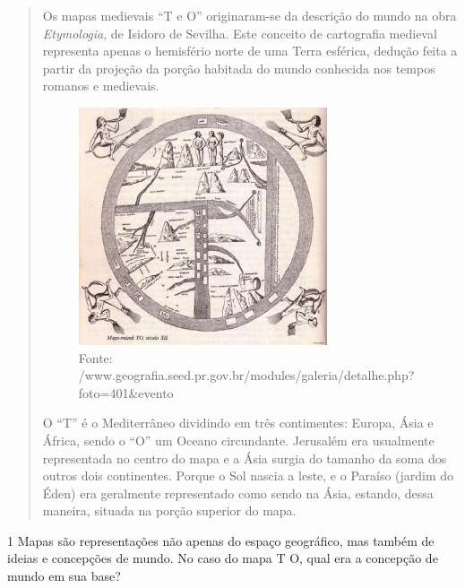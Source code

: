 \begin{quote}
Os mapas medievais ``T e O'' originaram-se da descrição do mundo na
obra \emph{Etymologia}, de Isidoro de Sevilha. Este conceito de
cartografia medieval representa apenas o hemisfério norte de uma Terra
esférica, dedução feita a partir da projeção da porção habitada do mundo
conhecida nos tempos romanos e medievais.

\begin{figure}[htpb!]
\includegraphics[width=2.88577in,height=2.76032in]{./imgs/img1.jpg}
\caption{Fonte: /www.geografia.seed.pr.gov.br/modules/galeria/detalhe.php?foto=401\&evento}
\end{figure}

O ``T'' é o Mediterrâneo
dividindo em três contimentes: Europa, Ásia e África, sendo o ``O'' um
Oceano circundante. Jerusalém era usualmente representada no centro do
mapa e a Ásia surgia do tamanho da soma dos outros dois continentes.
Porque o Sol nascia a leste, e o Paraíso (jardim do Éden) era geralmente
representado como sendo na Ásia, estando, dessa maneira, situada na
porção superior do mapa.

\end{quote}

\num{1} Mapas são representações não apenas do espaço geográfico, mas também
de ideias e concepções de mundo. No caso do mapa T O, qual era a
concepção de mundo em sua base?



